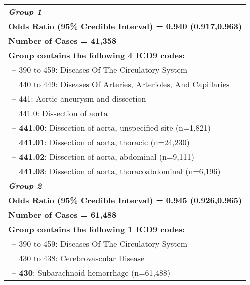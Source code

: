\renewcommand\arraystretch{0.6}\begin{longtable}{p{\textwidth}} \hline
 
\textbf{\emph{Group 1}}\\ 
\textbf{Odds Ratio (95\% Credible Interval) = 0.940 (0.917,0.963)} \\ \textbf{Number of Cases = 41,358} \\ \textbf{Group contains the following 4 ICD9 codes:} \\ \-\ \hspace{ 0pt}\footnotesize{-- 390 to 459: Diseases Of The Circulatory System} \\ \-\ \hspace{10pt}\footnotesize{-- 440 to 449: Diseases Of Arteries, Arterioles, And Capillaries} \\ \-\ \hspace{20pt}\footnotesize{-- 441: Aortic aneurysm and dissection} \\ \-\ \hspace{30pt}\footnotesize{-- 441.0: Dissection of aorta} \\ \-\ \hspace{40pt}\footnotesize{-- {\color{ForestGreen} \textbf{441.00}}: Dissection of aorta, unspecified site (n=1,821)} \\ \-\ \hspace{40pt}\footnotesize{-- {\color{ForestGreen} \textbf{441.01}}: Dissection of aorta, thoracic (n=24,230)} \\ \-\ \hspace{40pt}\footnotesize{-- {\color{ForestGreen} \textbf{441.02}}: Dissection of aorta, abdominal (n=9,111)} \\ \-\ \hspace{40pt}\footnotesize{-- {\color{ForestGreen} \textbf{441.03}}: Dissection of aorta, thoracoabdominal (n=6,196)} \\  
 \hline 
 
 \textbf{\emph{Group 2}}\\ 
\textbf{Odds Ratio (95\% Credible Interval) = 0.945 (0.926,0.965)} \\ \textbf{Number of Cases = 61,488} \\ \textbf{Group contains the following 1 ICD9 codes:} \\ \-\ \hspace{ 0pt}\footnotesize{-- 390 to 459: Diseases Of The Circulatory System} \\ \-\ \hspace{10pt}\footnotesize{-- 430 to 438: Cerebrovascular Disease} \\ \-\ \hspace{20pt}\footnotesize{-- {\color{ForestGreen} \textbf{430}}: Subarachnoid hemorrhage (n=61,488)} \\  
 \hline 
 

\end{longtable}
